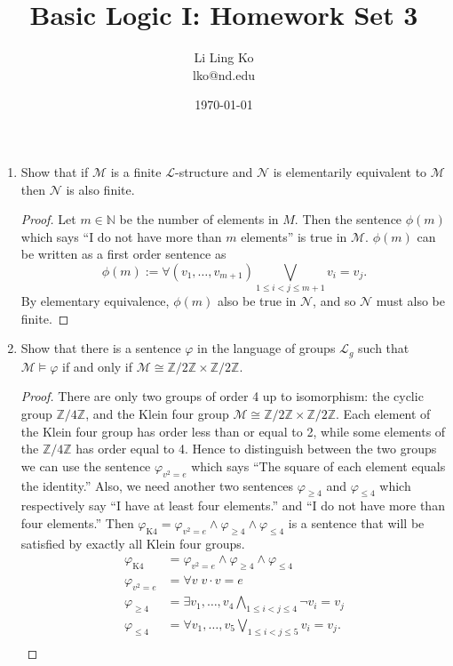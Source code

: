 \documentclass{article}
\begin{document}
\title{Basic Logic I: Homework Set 3}
\author{Li Ling Ko\\ lko@nd.edu}
\date{\today}
\maketitle

\begin{enumerate}
  \item Show that if $\mathcal{M}$ is a finite $\mathcal{L}$-structure and
    $\mathcal{N}$ is elementarily equivalent to $\mathcal{M}$ then
    $\mathcal{N}$ is also finite.
    \begin{proof}
      Let $m\in\mathbb{N}$ be the number of elements in $M$. Then the
      sentence $\phi(m)$ which says ``I do not have more than $m$
      elements'' is true in $\mathcal{M}$. $\phi(m)$ can be written as a
      first order sentence as
      \begin{equation*}
        \phi(m) := \forall(v_1,\ldots,v_{m+1}) \mathop{\bigvee}_{1\leq
        i<j\leq m+1} v_i=v_j.
      \end{equation*}
      By elementary equivalence, $\phi(m)$ also be true in $\mathcal{N}$,
      and so $\mathcal{N}$ must also be finite.
    \end{proof}

  \item Show that there is a sentence $\varphi$ in the language of groups
    $\mathcal{L}_g$ such that $\mathcal{M}\vDash\varphi$ if and only if
    $\mathcal{M}\cong\mathbb{Z}/2\mathbb{Z}\times\mathbb{Z}/2\mathbb{Z}$.
    \begin{proof}
      There are only two groups of order 4 up to isomorphism: the cyclic
      group $\mathbb{Z}/4\mathbb{Z}$, and the Klein four group
      $\mathcal{M}\cong\mathbb{Z}/2\mathbb{Z}\times\mathbb{Z}/2\mathbb{Z}$.
      Each element of the Klein four group has order less than or equal to
      2, while some elements of the $\mathbb{Z}/4\mathbb{Z}$ has order
      equal to 4. Hence to distinguish between the two groups we can use
      the sentence $\varphi_{v^2=e}$ which says ``The square of each
      element equals the identity.'' Also, we need another two sentences
      $\varphi_{\geq4}$ and $\varphi_{\leq4}$ which respectively say ``I
      have at least four elements.'' and ``I do not have more than four
      elements.'' Then
      $\varphi_{\text{K4}}=\varphi_{v^2=e}\wedge\varphi_{\geq4}\wedge\varphi_{\leq4}$
      is a sentence that will be satisfied by exactly all Klein four
      groups.
      \begin{align*}
        \varphi_{\text{K4}}   &=
          \varphi_{v^2=e}\wedge\varphi_{\geq4}\wedge\varphi_{\leq4} \\
        \varphi_{v^2=e} &= \forall v\; v\cdot v=e \\
        \varphi_{\geq4} &= \exists v_1,\ldots,v_4 \bigwedge_{1\leq i<j\leq 4}
          \neg v_i=v_j \\
        \varphi_{\leq4} &= \forall v_1,\ldots,v_5 \mathop{\bigvee}_{1\leq
          i<j\leq 5} v_i=v_j. \\
      \end{align*}
    \end{proof}


\end{enumerate}
\end{document}
